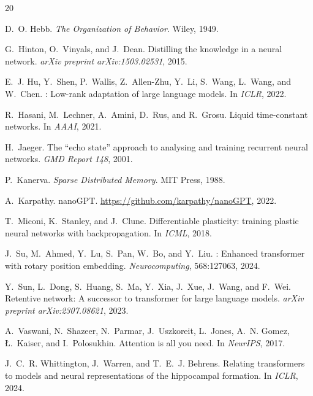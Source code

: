 \documentclass[11pt,twocolumn]{article}
\begin{document}

\begin{thebibliography}{20}

D.~O. Hebb.
\newblock \emph{The Organization of Behavior}.
\newblock Wiley, 1949.

G.~Hinton, O.~Vinyals, and J.~Dean.
\newblock Distilling the knowledge in a neural network.
\newblock \emph{arXiv preprint arXiv:1503.02531}, 2015.

E.~J. Hu, Y.~Shen, P.~Wallis, Z.~Allen-Zhu, Y.~Li, S.~Wang, L.~Wang, and W.~Chen.
: Low-rank adaptation of large language models.
\newblock In \emph{ICLR}, 2022.

R.~Hasani, M.~Lechner, A.~Amini, D.~Rus, and R.~Grosu.
\newblock Liquid time-constant networks.
\newblock In \emph{AAAI}, 2021.

H.~Jaeger.
\newblock The ``echo state'' approach to analysing and training recurrent neural networks.
\newblock \emph{GMD Report 148}, 2001.

P.~Kanerva.
\newblock \emph{Sparse Distributed Memory}.
\newblock MIT Press, 1988.

A.~Karpathy.
\newblock nanoGPT.
\newblock \url{https://github.com/karpathy/nanoGPT}, 2022.

T.~Miconi, K.~Stanley, and J.~Clune.
\newblock Differentiable plasticity: training plastic neural networks with backpropagation.
\newblock In \emph{ICML}, 2018.

J.~Su, M.~Ahmed, Y.~Lu, S.~Pan, W.~Bo, and Y.~Liu.
: Enhanced transformer with rotary position embedding.
\newblock \emph{Neurocomputing}, 568:127063, 2024.

Y.~Sun, L.~Dong, S.~Huang, S.~Ma, Y.~Xia, J.~Xue, J.~Wang, and F.~Wei.
\newblock Retentive network: A successor to transformer for large language models.
\newblock \emph{arXiv preprint arXiv:2307.08621}, 2023.

A.~Vaswani, N.~Shazeer, N.~Parmar, J.~Uszkoreit, L.~Jones, A.~N. Gomez, \L.~Kaiser, and I.~Polosukhin.
\newblock Attention is all you need.
\newblock In \emph{NeurIPS}, 2017.

J.~C.~R. Whittington, J.~Warren, and T.~E.~J. Behrens.
\newblock Relating transformers to models and neural representations of the hippocampal formation.
\newblock In \emph{ICLR}, 2024.

\end{thebibliography}
\end{document}
